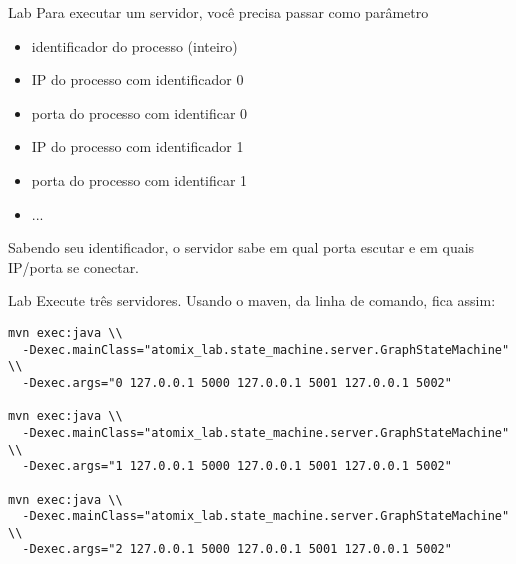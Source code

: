 \begin{frame}{Lab}
Para executar um servidor, você precisa passar como parâmetro
\begin{itemize}
	\item identificador do processo (inteiro)
	\item IP do processo com identificador 0
	\item porta do processo com identificar 0
	\item IP do processo com identificador 1
	\item porta do processo com identificar 1
	\item ...
\end{itemize}

Sabendo seu identificador, o servidor sabe em qual porta escutar e em quais IP/porta se conectar.
\end{frame}

\begin{frame}[fragile]{Lab}
Execute três servidores. Usando o maven, da linha de comando, fica assim:
\begin{tiny}
\begin{verbatim}
mvn exec:java \\
  -Dexec.mainClass="atomix_lab.state_machine.server.GraphStateMachine" \\
  -Dexec.args="0 127.0.0.1 5000 127.0.0.1 5001 127.0.0.1 5002"
	
mvn exec:java \\
  -Dexec.mainClass="atomix_lab.state_machine.server.GraphStateMachine" \\
  -Dexec.args="1 127.0.0.1 5000 127.0.0.1 5001 127.0.0.1 5002"
	
mvn exec:java \\
  -Dexec.mainClass="atomix_lab.state_machine.server.GraphStateMachine" \\
  -Dexec.args="2 127.0.0.1 5000 127.0.0.1 5001 127.0.0.1 5002"
\end{verbatim}
\end{tiny}
\end{frame}



